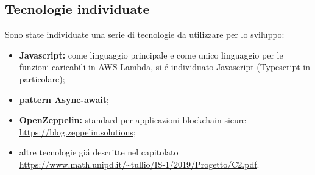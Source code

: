 \subsection{Tecnologie individuate}
Sono state individuate una serie di tecnologie da utilizzare per lo sviluppo:
\begin{itemize}
	\item \textbf{Javascript}\textbf{:} come linguaggio principale e come unico linguaggio per le funzioni caricabili in AWS Lambda, si é individuato Javascript (Typescript in particolare);
	\item \textbf{pattern Async-await};
	\item \textbf{OpenZeppelin}\textbf{:} standard per applicazioni blockchain sicure \url{https://blog.zeppelin.solutions};
	\item altre tecnologie giá descritte nel capitolato  \url{https://www.math.unipd.it/~tullio/IS-1/2019/Progetto/C2.pdf}.
\end{itemize}
